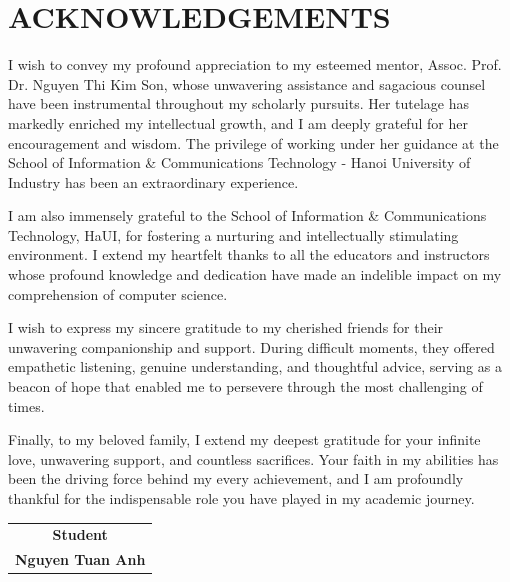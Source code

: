 \chapter*{ACKNOWLEDGEMENTS}


I wish to convey my profound appreciation to my esteemed mentor, Assoc. Prof. Dr. Nguyen Thi Kim Son, whose unwavering assistance and sagacious counsel have been instrumental throughout my scholarly pursuits. Her tutelage has markedly enriched my intellectual growth, and I am deeply grateful for her encouragement and wisdom. The privilege of working under her guidance at the School of Information \& Communications Technology - Hanoi University of Industry has been an extraordinary experience.

I am also immensely grateful to the School of Information \& Communications Technology, HaUI, for fostering a nurturing and intellectually stimulating environment. I extend my heartfelt thanks to all the educators and instructors whose profound knowledge and dedication have made an indelible impact on my comprehension of computer science.

I wish to express my sincere gratitude to my cherished friends for their unwavering companionship and support. During difficult moments, they offered empathetic listening, genuine understanding, and thoughtful advice, serving as a beacon of hope that enabled me to persevere through the most challenging of times.

Finally, to my beloved family, I extend my deepest gratitude for your infinite love, unwavering support, and countless sacrifices. Your faith in my abilities has been the driving force behind my every achievement, and I am profoundly thankful for the indispensable role you have played in my academic journey.

\vspace{1.5cm} %
\begin{flushright}
    \begin{tabular}{c}
        \textbf{Student} \\[2cm] %
        \textbf{Nguyen Tuan Anh}
    \end{tabular}
\end{flushright}
